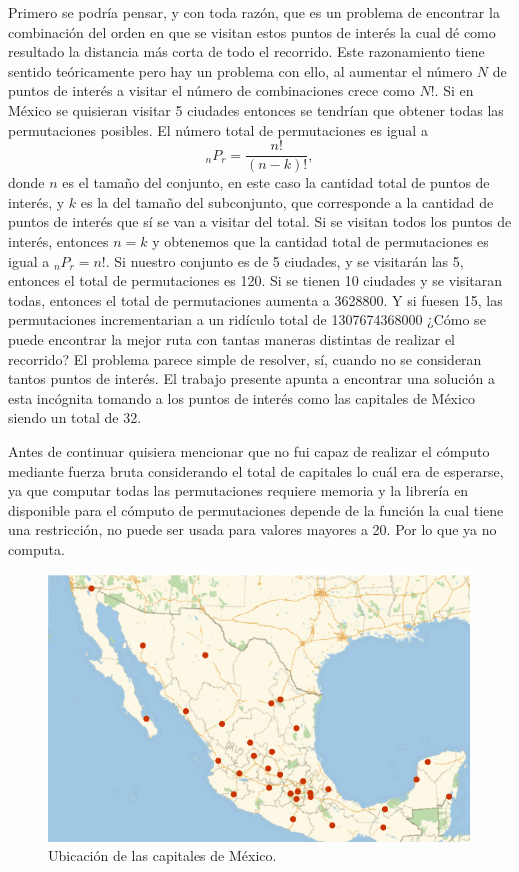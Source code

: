 Primero se podría pensar, y con toda razón, que es un problema de encontrar la combinación del orden en que se visitan estos puntos de interés la cual dé como resultado la distancia más corta de todo el recorrido. Este razonamiento tiene sentido teóricamente pero hay un problema con ello, al aumentar el número $N$ de puntos de interés a visitar el número de combinaciones crece como $N!$. Si en México se quisieran visitar 5 ciudades entonces se tendrían que obtener todas las permutaciones posibles. El número total de permutaciones es igual a
\begin{equation*}
    _{n}{P}_{r} = \frac{n!}{(n - k)!} ,
\end{equation*}
donde $n$ es el tamaño del conjunto, en este caso la cantidad total de puntos de interés, y $k$ es la del tamaño del subconjunto, que corresponde a la cantidad de puntos de interés que sí se van a visitar del total. Si se visitan todos los puntos de interés, entonces $n = k$ y obtenemos que la cantidad total de permutaciones es igual a $_{n}P_{r} = n!$. Si nuestro conjunto es de 5 ciudades, y se visitarán las 5, entonces el total de permutaciones es 120. Si se tienen 10 ciudades y se visitaran todas, entonces el total de permutaciones aumenta a 3628800. Y si fuesen 15, las permutaciones incrementarian a un ridículo total de 1307674368000 ¿Cómo se puede encontrar la mejor ruta con tantas maneras distintas de realizar el recorrido? El problema parece simple de resolver, sí, cuando no se consideran tantos puntos de interés. El trabajo presente apunta a encontrar una solución a esta incógnita tomando a los puntos de interés como las capitales de México siendo un total de 32.

Antes de continuar quisiera mencionar que no fui capaz de realizar el cómputo mediante fuerza bruta considerando el total de capitales lo cuál era de esperarse, ya que computar todas las permutaciones requiere memoria y la librería en  disponible para el cómputo de permutaciones depende de la función  la cual tiene una restricción, no puede ser usada para valores mayores a 20. Por lo que  ya no computa.

\begin{figure}[ht!]
    \centering
    \includegraphics[scale=0.8]{../figures/capital_locations.pdf}
    \caption{Ubicación de las capitales de México.}
    \label{fig:capitales_mexico}
\end{figure}

